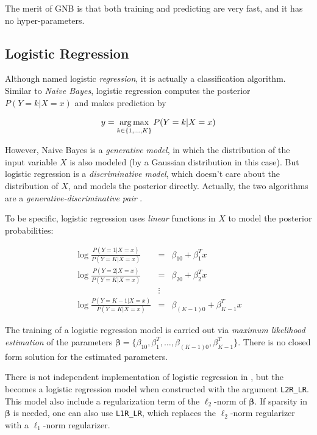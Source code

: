 The merit of GNB is that both training and predicting are very fast, and it has
no hyper-parameters.

\subsection{Logistic Regression}

Although named logistic \emph{regression}, it is actually a classification
algorithm. Similar to \emph{Naive Bayes}, logistic regression computes the
posterior $P(Y=k|X=x)$ and makes prediction by

\[
    y = \operatorname*{arg\,max}_{k\in\{1,\ldots,K\}} P(Y=k|X=x)
\]

However, Naive Bayes is a \emph{generative model}, in which the distribution of
the input variable $X$ is also modeled (by a Gaussian distribution in this
case). But logistic regression is a \emph{discriminative model}, which doesn't
care about the distribution of $X$, and models the posterior directly.
Actually, the two algorithms are a \emph{generative-discriminative pair}
\citep{DBLP:conf/nips/NgJW01}.

To be specific, logistic regression uses \emph{linear} functions in $X$ to model the
posterior probabilities:

\begin{eqnarray}
    \log\frac{P(Y=1|X=x)}{P(Y=K|X=x)} &=& \beta_{10} + \beta_1^Tx \\
    \log\frac{P(Y=2|X=x)}{P(Y=K|X=x)} &=& \beta_{20} + \beta_2^Tx \\
    &\vdots& \nonumber\\
    \log\frac{P(Y=K-1|X=x)}{P(Y=K|X=x)} &=& \beta_{(K-1)0} + \beta_{K-1}^Tx
\end{eqnarray}

The training of a logistic regression model is carried out via \emph{maximum
    likelihood estimation} of the parameters
$\boldsymbol\beta = \{\beta_{10},\beta_1^T,\ldots,\beta_{(K-1)0},\beta_{K-1}^T\}$. There is no
closed form solution for the estimated parameters.

There is not independent implementation of logistic regression in \shogun{}, 
but the  becomes a logistic regression model when
constructed with the argument \Verb|L2R_LR|. This model also include a
regularization term of the $\ell_2$-norm of $\boldsymbol\beta$. If sparsity in
$\boldsymbol\beta$ is needed, one can also use \Verb|L1R_LR|, which replaces
the $\ell_2$-norm regularizer with a $\ell_1$-norm regularizer.

